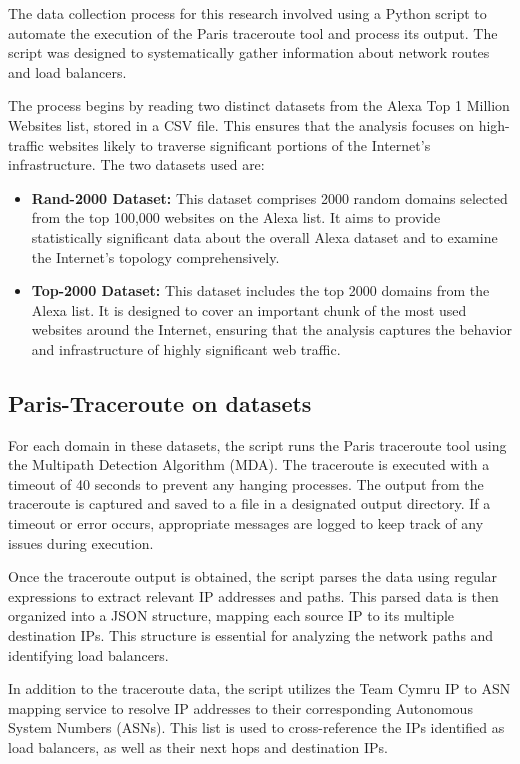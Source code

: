 \documentclass[12pt]{cwru_thesis}
\begin{document}
The data collection process for this research involved using a Python script to automate the execution of the Paris traceroute tool and process its output. The script was designed to systematically gather information about network routes and load balancers.

The process begins by reading two distinct datasets from the Alexa Top 1 Million Websites list, stored in a CSV file. This ensures that the analysis focuses on high-traffic websites likely to traverse significant portions of the Internet's infrastructure. The two datasets used are:

\begin{itemize}
    \item \textbf{Rand-2000 Dataset:} This dataset comprises 2000 random domains selected from the top 100,000 websites on the Alexa list. It aims to provide statistically significant data about the overall Alexa dataset and to examine the Internet's topology comprehensively.
    \item \textbf{Top-2000 Dataset:} This dataset includes the top 2000 domains from the Alexa list. It is designed to cover an important chunk of the most used websites around the Internet, ensuring that the analysis captures the behavior and infrastructure of highly significant web traffic.
\end{itemize}



\subsection{Paris-Traceroute on datasets}

For each domain in these datasets, the script runs the Paris traceroute tool using the Multipath Detection Algorithm (MDA). The traceroute is executed with a timeout of 40 seconds to prevent any hanging processes. The output from the traceroute is captured and saved to a file in a designated output directory. If a timeout or error occurs, appropriate messages are logged to keep track of any issues during execution.

Once the traceroute output is obtained, the script parses the data using regular expressions to extract relevant IP addresses and paths. This parsed data is then organized into a JSON structure, mapping each source IP to its multiple destination IPs. This structure is essential for analyzing the network paths and identifying load balancers.

In addition to the traceroute data, the script utilizes the Team Cymru IP to ASN mapping service to resolve IP addresses to their corresponding Autonomous System Numbers (ASNs). This list is used to cross-reference the IPs identified as load balancers, as well as their next hops and destination IPs.
\end{document}
